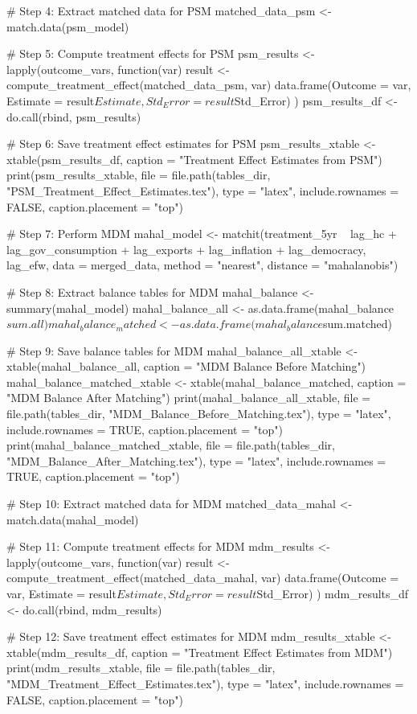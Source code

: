 # Step 4: Extract matched data for PSM
matched_data_psm <- match.data(psm_model)

# Step 5: Compute treatment effects for PSM
psm_results <- lapply(outcome_vars, function(var) {
  result <- compute_treatment_effect(matched_data_psm, var)
  data.frame(Outcome = var, Estimate = result$Estimate, Std_Error = result$Std_Error)
})
psm_results_df <- do.call(rbind, psm_results)

# Step 6: Save treatment effect estimates for PSM
psm_results_xtable <- xtable(psm_results_df, caption = "Treatment Effect Estimates from PSM")
print(psm_results_xtable, file = file.path(tables_dir, "PSM_Treatment_Effect_Estimates.tex"),
      type = "latex", include.rownames = FALSE, caption.placement = "top")

# Step 7: Perform MDM
mahal_model <- matchit(treatment_5yr ~ lag_hc + lag_gov_consumption + lag_exports + lag_inflation + lag_democracy, lag_efw,
                       data = merged_data, method = "nearest", distance = "mahalanobis")

# Step 8: Extract balance tables for MDM
mahal_balance <- summary(mahal_model)
mahal_balance_all <- as.data.frame(mahal_balance$sum.all)
mahal_balance_matched <- as.data.frame(mahal_balance$sum.matched)

# Step 9: Save balance tables for MDM
mahal_balance_all_xtable <- xtable(mahal_balance_all, caption = "MDM Balance Before Matching")
mahal_balance_matched_xtable <- xtable(mahal_balance_matched, caption = "MDM Balance After Matching")
print(mahal_balance_all_xtable, file = file.path(tables_dir, "MDM_Balance_Before_Matching.tex"),
      type = "latex", include.rownames = TRUE, caption.placement = "top")
print(mahal_balance_matched_xtable, file = file.path(tables_dir, "MDM_Balance_After_Matching.tex"),
      type = "latex", include.rownames = TRUE, caption.placement = "top")

# Step 10: Extract matched data for MDM
matched_data_mahal <- match.data(mahal_model)

# Step 11: Compute treatment effects for MDM
mdm_results <- lapply(outcome_vars, function(var) {
  result <- compute_treatment_effect(matched_data_mahal, var)
  data.frame(Outcome = var, Estimate = result$Estimate, Std_Error = result$Std_Error)
})
mdm_results_df <- do.call(rbind, mdm_results)

# Step 12: Save treatment effect estimates for MDM
mdm_results_xtable <- xtable(mdm_results_df, caption = "Treatment Effect Estimates from MDM")
print(mdm_results_xtable, file = file.path(tables_dir, "MDM_Treatment_Effect_Estimates.tex"),
      type = "latex", include.rownames = FALSE, caption.placement = "top")

